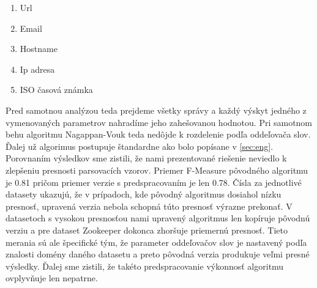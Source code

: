 \begin{enumerate}
  \item Url
  \item Email
  \item Hostname
  \item Ip adresa
  \item ISO časová známka
\end{enumerate}

Pred samotnou analýzou teda prejdeme všetky správy a každý výskyt jedného z vymenovaných parametrov nahradíme jeho zahešovanou hodnotou. Pri samotnom behu algoritmu Nagappan-Vouk teda nedôjde k rozdelenie podľa oddeľovača slov. Ďalej už algorimus postupuje štandardne ako bolo popísane v \ref{sec:eng}. Porovnaním výsledkov sme zistili, že nami prezentované riešenie neviedlo k zlepšeniu presnosti parsovacích vzorov. Priemer F-Measure pôvodného algoritmu je 0.81 pričom priemer verzie s predspracovaním je len 0.78. Čísla za jednotlivé datasety ukazujú, že v prípadoch, kde pôvodný algoritmus dosiahol nízku presnosť, upravená verzia nebola schopná túto presnosť výrazne prekonať. V datasetoch s vysokou presnosťou nami upravený algoritmus len kopíruje pôvodnú verziu a pre dataset Zookeeper dokonca zhoršuje priemernú presnosť. Tieto merania sú ale špecifické tým, že parameter oddeľovačov slov je nastavený podľa znalosti domény daného datasetu a preto pôvodná verzia produkuje veľmi presné výsledky. Ďalej sme zistili, že takéto predspracovanie výkonnosť algoritmu ovplyvňuje len nepatrne.